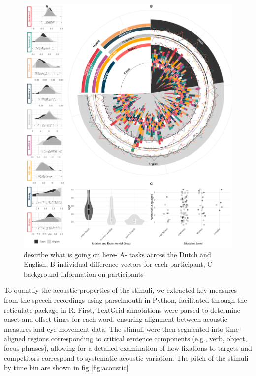 \clearpage
\begin{figure}[H]  %
    \centering
    \includegraphics[width=\textwidth,height=\textheight,keepaspectratio]{viz/combined_plot_circle.png}
    \caption{describe what is going on here- A- tasks across the Dutch and English, B individual difference vectors for each participant, C background information on participants}
    \label{fig:combined_plot}
\end{figure}
\clearpage


To quantify the acoustic properties of the stimuli, we extracted key measures from the speech recordings using parselmouth \citep{Boersma2022} in Python, facilitated through the reticulate package \citep{Ushey2022} in R. First, TextGrid annotations were parsed to determine onset and offset times for each word, ensuring alignment between acoustic measures and eye-movement data. The stimuli were then segmented into time-aligned regions corresponding to critical sentence components (e.g., verb, object, focus phrases), allowing for a detailed examination of how fixations to targets and competitors correspond to systematic acoustic variation. The pitch of the stimuli by time bin are shown in fig \ref{fig:acoustic}.

